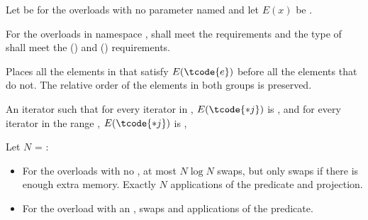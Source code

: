 \begin{itemdescr}
\pnum
Let  be 
for the overloads with no parameter named 
and let $E(x)$ be .

\requires
For the overloads in namespace ,
 shall meet
the  requirements and
the type of  shall meet
the  () and
 () requirements.

\pnum
\effects
Places all the elements  in 
that satisfy $E(\tcode{e})$ before all the elements that do not.
The relative order of the elements in both groups is preserved.

\pnum
\returns
An iterator 
such that for every iterator  in ,
$E(\tcode{*j})$ is ,
and for every iterator  in the range ,
$E(\tcode{*j})$ is ,

\pnum
\complexity
Let $N$ = :
\begin{itemize}
\item
  For the overloads with no , at most $N \log N$ swaps,
  but only  swaps if there is enough extra memory.
  Exactly $N$ applications of the predicate and projection.
\item
  For the overload with an ,
   swaps and  applications of the predicate.
\end{itemize}
\end{itemdescr}


